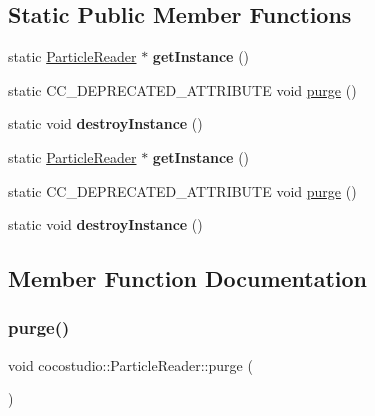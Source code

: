 \subsection*{Static Public Member Functions}
\begin{DoxyCompactItemize}
\item 
\mbox{\label{classcocostudio_1_1ParticleReader_a80fd910912f9035b427536b888e48924}} 
static \hyperlink{classcocostudio_1_1ParticleReader}{Particle\+Reader} $\ast$ {\bfseries get\+Instance} ()
\item 
static C\+C\+\_\+\+D\+E\+P\+R\+E\+C\+A\+T\+E\+D\+\_\+\+A\+T\+T\+R\+I\+B\+U\+TE void \hyperlink{classcocostudio_1_1ParticleReader_a5a8d54e4df3b1b213f5d484a2352c523}{purge} ()
\item 
\mbox{\label{classcocostudio_1_1ParticleReader_a920c6abad45b727d8edc0a0743636a86}} 
static void {\bfseries destroy\+Instance} ()
\item 
\mbox{\label{classcocostudio_1_1ParticleReader_aa138bdf6bf7817f0c0bacc5955af3a15}} 
static \hyperlink{classcocostudio_1_1ParticleReader}{Particle\+Reader} $\ast$ {\bfseries get\+Instance} ()
\item 
static C\+C\+\_\+\+D\+E\+P\+R\+E\+C\+A\+T\+E\+D\+\_\+\+A\+T\+T\+R\+I\+B\+U\+TE void \hyperlink{classcocostudio_1_1ParticleReader_a673cbfc148ac6e11b405d3a8b2ed2603}{purge} ()
\item 
\mbox{\label{classcocostudio_1_1ParticleReader_acbb80922fd5060e866c1be8a24321ed1}} 
static void {\bfseries destroy\+Instance} ()
\end{DoxyCompactItemize}


\subsection{Member Function Documentation}
\mbox{\label{classcocostudio_1_1ParticleReader_a5a8d54e4df3b1b213f5d484a2352c523}} 
\subsubsection{\texorpdfstring{purge()}{purge()}\hspace{0.1cm}{\footnotesize\ttfamily [1/2]}}
{\footnotesize\ttfamily void cocostudio\+::\+Particle\+Reader\+::purge (\begin{DoxyParamCaption}{ }\end{DoxyParamCaption})\hspace{0.3cm}{\ttfamily [static]}}

